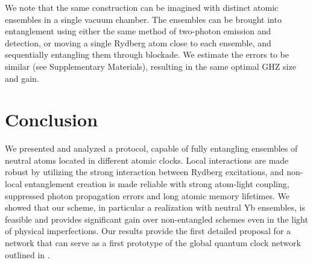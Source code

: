 We note that the same construction can be imagined
with distinct atomic ensembles in a single vacuum chamber. The ensembles can be
brought into entanglement using either the same method of two-photon emission
and detection, or moving a single Rydberg atom close to each ensemble, and
sequentially entangling them through blockade. We estimate the errors to be
similar (see Supplementary Materials), resulting in the same optimal GHZ size
and gain.




\section{Conclusion}

We presented and analyzed a protocol, capable of fully entangling ensembles of
neutral atoms located in different atomic clocks. Local interactions are made
robust by utilizing the strong interaction between Rydberg excitations, and
non-local entanglement creation is made reliable with strong atom-light
coupling, suppressed photon propagation errors and long atomic memory lifetimes.
We showed that our scheme, in particular a realization with neutral Yb
ensembles, is feasible and provides significant gain over non-entangled schemes
even in the light of physical imperfections. Our results provide the first
detailed proposal for a network that can serve as a first prototype of the
global quantum clock network outlined in \cite{Komar2014}.
